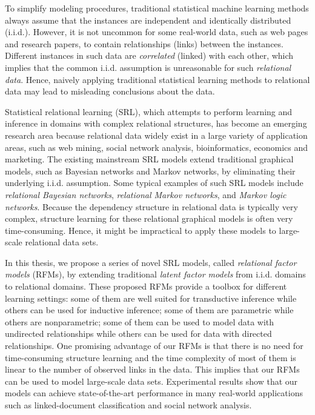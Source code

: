 


To simplify modeling procedures, traditional statistical machine learning methods always assume that the instances are independent and identically distributed (i.i.d.). However, it is not uncommon for some real-world data, such as web pages and research papers, to contain relationships (links) between the instances. Different instances in such data are \emph{correlated} (linked) with each other, which implies that the common i.i.d. assumption is unreasonable for such \emph{relational data}. Hence, naively applying traditional statistical learning methods to relational data may lead to misleading conclusions about the data.

Statistical relational learning (SRL), which attempts to perform learning and inference in domains with complex relational structures, has become an emerging research area because relational data widely exist in a large variety of application areas, such as web mining, social network analysis, bioinformatics, economics and marketing. The existing mainstream SRL models extend traditional graphical models, such as Bayesian networks and Markov networks, by eliminating their underlying i.i.d. assumption. Some typical examples of such SRL models include \emph{relational Bayesian networks}, \emph{relational Markov networks}, and \emph{Markov logic networks}. Because the dependency structure in relational data is typically very complex, structure learning for these relational graphical models is often very time-consuming. Hence, it might be impractical to apply these models to large-scale relational data sets.

In this thesis, we propose a series of novel SRL models, called \emph{relational factor models} (RFMs), by extending traditional \emph{latent factor models} from i.i.d. domains to relational domains. These proposed RFMs provide a toolbox for different learning settings: some of them are well suited for transductive inference while others can be used for inductive inference; some of them are parametric while others are nonparametric; some of them can be used to model data with undirected relationships while others can be used for data with directed relationships. One promising advantage of our RFMs is that there is no need for time-consuming structure learning and the time complexity of most of them is linear to the number of observed links in the data. This implies that our RFMs can be used to model large-scale data sets. Experimental results show that our models can achieve state-of-the-art performance in many real-world applications such as linked-document classification and social network analysis.

